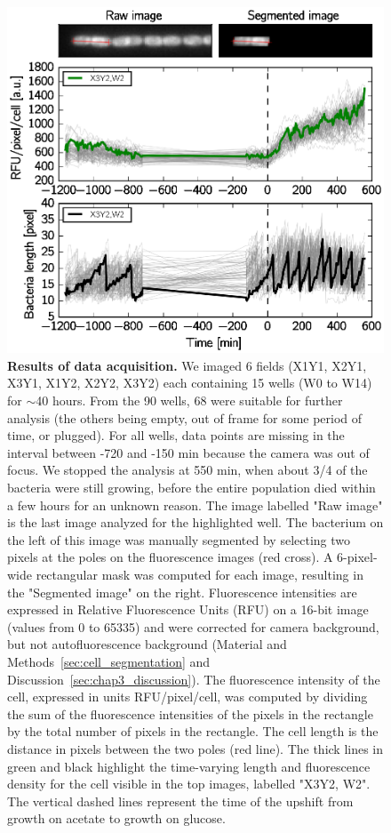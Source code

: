 \begin{figure}[p]
\centering
\includegraphics[scale=1]{./Fig/data_acquisition}
\caption{
\textbf{Results of data acquisition.}
We imaged 6 fields (X1Y1, X2Y1, X3Y1, X1Y2, X2Y2, X3Y2) each containing 15 wells (W0 to W14) for $\sim$40 hours.
From the 90 wells, 68 were suitable for further analysis (the others being empty, out of frame for some period of time, or plugged).
For all wells, data points are missing in the interval between -720 and -150 min because the camera was out of focus.
We stopped the analysis at 550 min, when about 3/4 of the bacteria were still growing, before the entire population died within a few hours for an unknown reason.
The image labelled "Raw image" is the last image analyzed for the highlighted well.
The bacterium on the left of this image was manually segmented by selecting two pixels at the poles on the fluorescence images (red cross).
A 6-pixel-wide rectangular mask was computed for each image, resulting in the "Segmented image" on the right.
Fluorescence intensities are expressed in Relative Fluorescence Units (RFU) on a 16-bit image (values from 0 to 65335) and were corrected for camera background, but not autofluorescence background (Material and Methods~\ref{sec:cell_segmentation} and Discussion~\ref{sec:chap3_discussion}).
The fluorescence intensity of the cell, expressed in units RFU/pixel/cell, was computed by dividing the sum of the fluorescence intensities of the pixels in the rectangle by the total number of pixels in the rectangle.
The cell length is the distance in pixels between the two poles (red line).
The thick lines in green and black highlight the time-varying length and fluorescence density for the cell visible in the top images, labelled "X3Y2, W2".
The vertical dashed lines represent the time of the upshift from growth on acetate to growth on glucose.
}
\label{fig:data_acquisition}
\end{figure}

